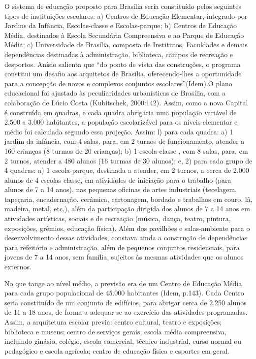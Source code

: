 O sistema de educação proposto para Brasília seria constituído pelos seguintes
tipos de instituições escolares: a) Centros de Educação Elementar, integrado por Jardins
da Infância, Escolas-classe e Escolas-parque; b) Centros de Educação Média, destinados
à Escola Secundária Compreensiva e ao Parque de Educação Média; c) Universidade de
Brasília, composta de Institutos, Faculdades e demais dependências destinadas à
administração, biblioteca, campos de recreação e desportos.
Anísio salienta que “do ponto de vista das construções, o programa constitui um desafio
aos arquitetos de Brasília, oferecendo-lhes a oportunidade para a concepção de novos e
complexos conjuntos escolares”(Idem).O plano educacional foi ajustado às
peculiaridades urbanísticas de Brasília, com a colaboração de Lúcio Costa (Kubitschek,
2000:142). Assim, como a nova Capital é construída em quadras, e cada quadra
abrigaria uma população variável de 2.500 a 3.000 habitantes, a população escolarizável
para os níveis elementar e médio foi calculada segundo essa projeção. Assim: l) para
cada quadra: a) 1 jardim da infância, com 4 salas, para, em 2 turnos de funcionamento,
atender a 160 crianças (8 turmas de 20 crianças); b) 1 escola-classe , com 8 salas, para,
em 2 turnos, atender a 480 alunos (16 turmas de 30 alunos); e, 2) para cada grupo de 4
quadras: a) 1 escola-parque, destinada a atender, em 2 turnos, a cerca de 2.000 alunos de
4 escolas-classe, em atividades de iniciação para o trabalho (para alunos de 7 a 14 anos),
nas pequenas oficinas de artes industriais (tecelagem, tapeçaria, encadernação,
cerâmica, cartonagem, bordado e trabalhos em couro, lã, madeira, metal, etc.), além da
participação dirigida dos alunos de 7 a 14 anos em atividades artísticas, sociais e de
recreação (música, dança, teatro, pintura, exposições, grêmios, educação física). Além
dos pavilhões e salas-ambiente para o desenvolvimento dessas atividades, constava
ainda a construção de dependências para refeitório e administração, além de pequenos
conjuntos residenciais, para jovens de 7 a 14 anos, sem família, sujeitos às mesmas
atividades que os alunos externos.

No que tange ao nível médio, a previsão era de um Centro de Educação Média
para cada grupo populacional de 45.000 habitantes (Idem, p.143). Cada Centro seria
constituído de um conjunto de edifícios, para abrigar cerca de 2.250 alunos de 11 a 18
anos, de forma a adequar-se ao exercício das atividades programadas. Assim, a
arquitetura escolar previa: centro cultural, teatro e exposições; biblioteca e museus;
centro de serviços gerais; escola média compreensiva, incluindo ginásio, colégio, escola
comercial, técnico-industrial, curso normal ou pedagógico e escola agrícola; centro de
educação física e esportes em geral.

